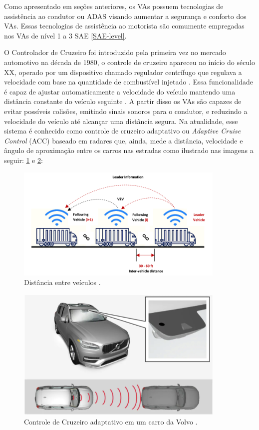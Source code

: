 Como apresentado em seções anteriores, os VAs possuem tecnologias de assistência ao condutor ou ADAS visando aumentar a segurança e conforto dos VAs. Essas tecnologias de assistência ao motorista são comumente empregadas nos VAs de nível 1 a 3 SAE \ref{SAE-level}.


O Controlador de Cruzeiro foi introduzido pela primeira vez no mercado automotivo na década de 1980, o controle de cruzeiro apareceu no início do século XX, operado por um dispositivo chamado regulador centrífugo que regulava a velocidade com base na quantidade de combustível injetado \cite{caio}. Essa funcionalidade é capaz de ajustar automaticamente a velocidade do veículo mantendo uma distância constante do veículo seguinte \cite{sensors-yet}.
A partir disso os VAs são capazes de evitar possíveis colisões, emitindo sinais sonoros para o condutor, e reduzindo a velocidade do veículo até alcançar uma distância segura. Na atualidade, esse sistema é conhecido como controle de cruzeiro adaptativo ou \textit{Adaptive Cruise Control} (ACC) baseado em radares que, ainda, mede a distância, velocidade e ângulo de aproximação entre os carros nas estradas como ilustrado nas imagens a seguir: \ref{cruzeiro} e \ref{ACC}:

\begin{figure}[H]
\centering
\includegraphics[width=10cm]{Figures/cruzeiro.png}
\caption{Distância entre veículos \cite{review-auto}.}
\label{cruzeiro}
\end{figure}


\begin{figure}[H]
\centering
\includegraphics[width=10cm]{Figures/ACC.png}
\caption{Controle de Cruzeiro adaptativo em um carro da Volvo \cite{caio}.}
\label{ACC}
\end{figure}


